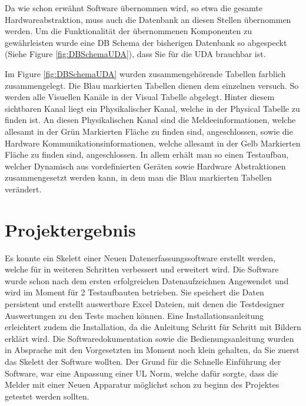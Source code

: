\documentclass[10pt]{scrartcl}
\begin{document}
Da wie schon erwähnt Software übernommen wird, so etwa die gesamte Hardwareabstraktion, muss auch die Datenbank an diesen Stellen übernommen werden. Um die Funktionalität der übernommenen Komponenten zu gewährleisten wurde eine DB Schema der bisherigen Datenbank so abgespeckt (Siehe Figure \ref{fig:DBSchemaUDA}), dass Sie für die UDA brauchbar ist.


Im Figure \ref{fig:DBSchemaUDA} wurden zusammengehörende Tabellen farblich zusammengelegt. Die Blau markierten Tabellen dienen dem einzelnen versuch. So werden alle Visuellen Kanäle in der Visual Tabelle abgelegt. Hinter diesem sichtbaren Kanal liegt ein Physikalischer Kanal, welche in der Physical Tabelle zu finden ist. An diesen Physikalischen Kanal sind die Meldeeinformationen, welche allesamt in der Grün Markierten Fläche zu finden sind, angeschlossen, sowie die Hardware Kommunikationsinformationen, welche allesamt in der Gelb Markierten Fläche zu finden sind, angeschlossen. In allem erhält man so einen Testaufbau, welcher Dynamisch aus vordefinierten Geräten sowie Hardware Abstraktionen zusammengesetzt werden kann, in dem man die Blau markierten Tabellen verändert.
\section{Projektergebnis}
Es konnte ein Skelett einer Neuen Datenerfassungssoftware erstellt werden, welche für in weiteren Schritten verbessert und erweitert wird. Die Software wurde schon nach dem ersten erfolgreichen Datenaufzeichnen Angewendet und wird im Moment für 2 Testaufbauten betrieben. Sie speichert die Daten persistent und erstellt auswertbare Excel Dateien, mit denen die Testdesigner Auswertungen zu den Tests machen können.
Eine Installationsanleitung erleichtert zudem die Installation, da die Anleitung Schritt für Schritt mit Bildern erklärt wird.
Die Softwaredokumentation sowie die Bedienungsanleitung wurden in Absprache mit den Vorgesetzten im Moment noch klein gehalten, da Sie zuerst das Skelett der Software wollten. Der Grund für die Schnelle Einführung der Software, war eine Anpassung einer UL Norm, welche dafür sorgte, dass die Melder mit einer Neuen Apparatur möglichst schon zu beginn des Projektes getestet werden sollten.
\end{document}
